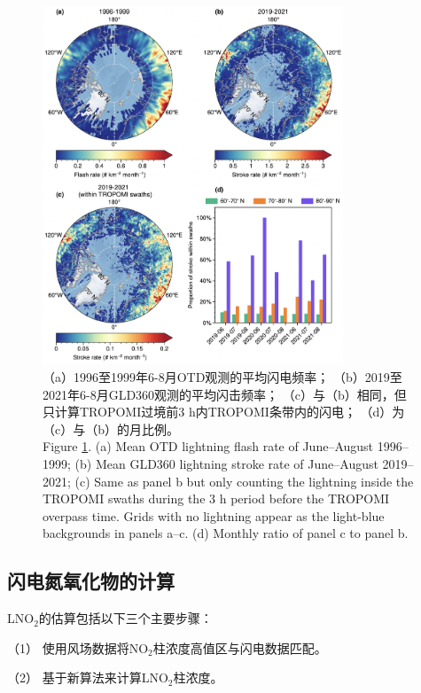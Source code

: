 \begin{figure}[H]
\centering
\includegraphics[width=0.8\textwidth]{./figures/arctic_lightning_distribution.png}
\caption{
（a）1996至1999年6-8月OTD观测的平均闪电频率；
（b）2019至2021年6-8月GLD360观测的平均闪击频率；
（c）与（b）相同，但只计算TROPOMI过境前3 h内TROPOMI条带内的闪电；
（d）为（c）与（b）的月比例。\\
Figure \ref{fig:arctic_lightning_distribution}.
(a) Mean OTD lightning flash rate of June--August 1996--1999;
(b) Mean GLD360 lightning stroke rate of June--August 2019--2021;
(c) Same as panel b but only counting the lightning inside the TROPOMI swaths during the 3 h period before the TROPOMI overpass time.
Grids with no lightning appear as the light-blue backgrounds in panels a--c.
(d) Monthly ratio of panel c to panel b.
}
\label{fig:arctic_lightning_distribution}
\end{figure}

\subsection{闪电氮氧化物的计算} \label{sec:arctic_lnox_calc}

LNO$_2$的估算包括以下三个主要步骤：

（1） 使用风场数据将NO$_2$柱浓度高值区与闪电数据匹配。

（2） 基于新算法来计算LNO$_2$柱浓度。

